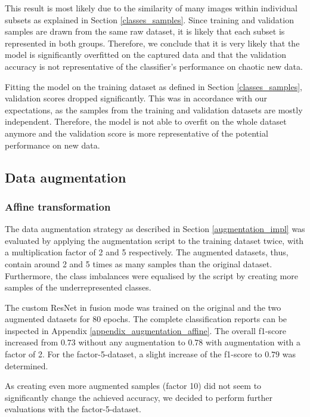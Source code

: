 \documentclass{l4proj}
\begin{document}
This result is most likely due to the similarity of many images within individual subsets as explained in Section \ref{classes_samples}. Since training and validation samples are drawn from the same raw dataset, it is likely that each subset is represented in both groups. Therefore, we conclude that it is very likely that the model is significantly overfitted on the captured data and that the validation accuracy is not representative of the classifier's performance on chaotic new data. 

Fitting the model on the training dataset as defined in Section \ref{classes_samples}, validation scores dropped significantly. This was in accordance with our expectations, as the samples from the training and validation datasets are mostly independent. Therefore, the model is not able to overfit on the whole dataset anymore and the validation score is more representative of the potential performance on new data.

\subsection{Data augmentation}

\subsubsection{Affine transformation}

The data augmentation strategy as described in Section \ref{augmentation_impl} was evaluated by applying the augmentation script to the training dataset twice, with a multiplication factor of 2 and 5 respectively. The augmented datasets, thus, contain around 2 and 5 times as many samples than the original dataset. Furthermore, the class imbalances were equalised by the script by creating more samples of the underrepresented classes.

The custom ResNet in fusion mode was trained on the original and the two augmented datasets for 80 epochs. The complete classification reports can be inspected in Appendix \ref{appendix_augmentation_affine}. The overall f1-score increased from $0.73$ without any augmentation to $0.78$ with augmentation with a factor of 2. For the factor-5-dataset, a slight increase of the f1-score to $0.79$ was determined. 

As creating even more augmented samples (factor 10) did not seem to significantly change the achieved accuracy, we decided to perform further evaluations with the factor-5-dataset.
\end{document}
